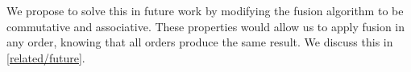 We propose to solve this in future work by modifying the fusion algorithm to be commutative and associative.
These properties would allow us to apply fusion in any order, knowing that all orders produce the same result.
We discuss this in \cref{related/future}.




